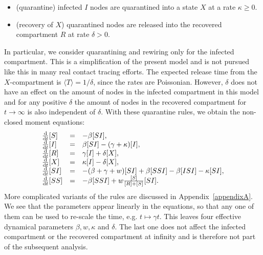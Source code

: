 \documentclass[12pt]{article}
\def\txtd{{\textnormal{d}}}
\begin{document}
\begin{itemize}
 \item (quarantine) infected $I$ nodes are quarantined into a state $X$ at a rate $\kappa\geq 0$.
 \item (recovery of $X$) quarantined nodes are released into the recovered compartment $R$ at rate $\delta>0$.
\end{itemize}

In particular, we consider quarantining and rewiring only for the infected compartment. This is a simplification of the present model and is not pursued like this in many real contact tracing efforts. The expected release time from the $X$-compartment is $\langle T\rangle = 1/\delta$, since the rates are Poissonian. However, $\delta$ does not have an effect on the amount of nodes in the infected compartment in this model and for any positive $\delta$ the amount of nodes in the recovered compartment for $t\to\infty$ is also independent of $\delta$. With these quarantine rules, we obtain the non-closed moment equations:
\begin{equation}
\label{eq:adaptiveSIRX}
\begin{array}{lcl}
 \frac{\txtd }{\txtd t} [S]
 &=&
 -\beta [SI], 
 \\
 \frac{\txtd }{\txtd t} [I]
 &=&
 \beta [SI] - (\gamma + \kappa)[I], 
 \\
 \frac{\txtd }{\txtd t} [R]
 &=&
\gamma [I] +\delta[X],
 \\
 \frac{\txtd }{\txtd t} [X]
 &=&
\kappa[I] - \delta[X],
 \\
 \frac{\txtd }{\txtd t} [SI]
 &=&
 -(\beta+\gamma+w)[SI] + \beta[SSI] -\beta[ISI] - \kappa [SI],
 \\
 \frac{\txtd }{\txtd t} [SS]
 &=&
- \beta [SSI] + w\frac{[S]}{[R]+[S]} [SI].
\end{array}
 \end{equation}
 More complicated variants of the rules are discussed in Appendix~\ref{appendixA}. 
 We see that the parameters appear linearly in the equations, so that any one of them can be used to re-scale the time, e.g. $t\mapsto \gamma t$. This leaves four effective dynamical parameters $\beta, w, \kappa$ and $\delta$. The last one does not affect the infected compartment or the recovered compartment at infinity and is therefore not part of the subsequent analysis.
 
\end{document}
